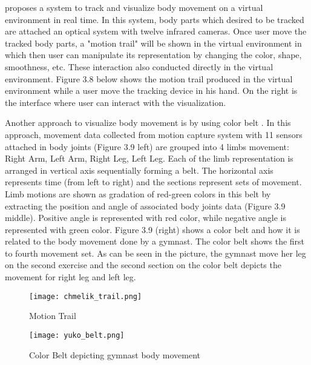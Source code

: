 \cite{chmelik} proposes a system to track and visualize body movement on a virtual environment in real time. In this system, body parts  which desired to be tracked are attached an optical system with twelve infrared cameras. Once user move the tracked body parts, a "motion trail" will be shown in the virtual environment in which then user can manipulate its representation by changing the color, shape, smoothness, etc. These interaction also conducted directly in the virtual environment. Figure 3.8 \cite{chmelik} below shows the motion trail produced in the virtual environment while a user move the tracking device in his hand. On the right is the interface where user can interact with the visualization.

Another approach to visualize body movement is by using color belt \cite{yuko}. In this approach, movement data collected from motion capture system with 11 sensors attached in body joints (Figure 3.9 left) are grouped into 4 limbs movement: Right Arm, Left Arm, Right Leg, Left Leg. Each of the limb representation is arranged in vertical axis sequentially forming a belt. The horizontal axis represents time (from left to right) and the sections represent sets of movement. Limb motions are shown as gradation of red-green colors in this belt by extracting the position and angle of associated body joints data (Figure 3.9 middle). Positive angle is represented with red color, while negative angle is represented with green color. Figure 3.9 (right) shows a color belt and how it is related to the body movement done by a gymnast. The color belt shows the first to fourth movement set. As can be seen in the picture, the gymnast move her leg on the second exercise and the second section on the color belt depicts the movement for right leg and left leg.

\begin{figure}
\centering
\texttt{[image: chmelik\_trail.png]}
\caption{Motion Trail}
\end{figure}

\begin{figure}
\centering
\texttt{[image: yuko\_belt.png]}
\caption{Color Belt depicting gymnast body movement}
\end{figure}

